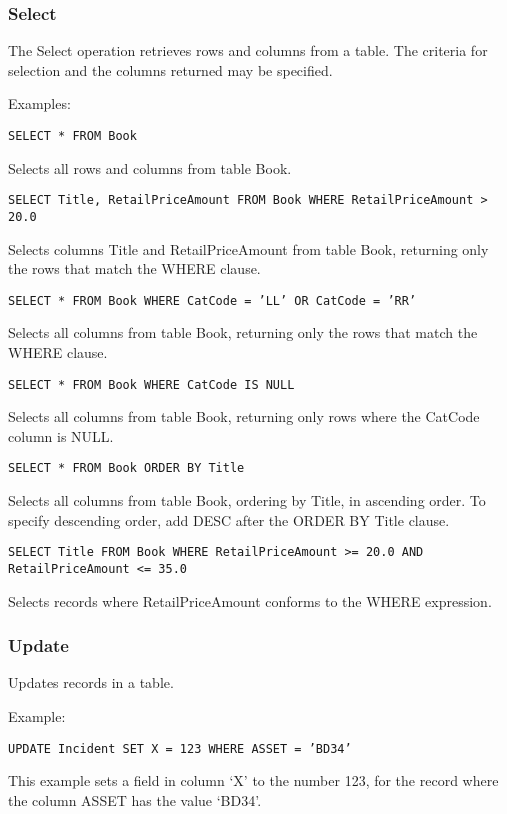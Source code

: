 \subsubsection{Select}\label{odbcselectexample}

The Select operation retrieves rows and columns from a table. The criteria
for selection and the columns returned may be specified.

Examples:

{\tt SELECT * FROM Book}

Selects all rows and columns from table Book.

{\tt SELECT Title, RetailPriceAmount FROM Book WHERE RetailPriceAmount > 20.0}

Selects columns Title and RetailPriceAmount from table Book, returning only
the rows that match the WHERE clause.

{\tt SELECT * FROM Book WHERE CatCode = 'LL' OR CatCode = 'RR'}

Selects all columns from table Book, returning only
the rows that match the WHERE clause.

{\tt SELECT * FROM Book WHERE CatCode IS NULL}

Selects all columns from table Book, returning only rows where the CatCode column
is NULL.

{\tt SELECT * FROM Book ORDER BY Title}

Selects all columns from table Book, ordering by Title, in ascending order. To specify
descending order, add DESC after the ORDER BY Title clause.

{\tt SELECT Title FROM Book WHERE RetailPriceAmount >= 20.0 AND RetailPriceAmount <= 35.0}

Selects records where RetailPriceAmount conforms to the WHERE expression.

\subsubsection{Update}\label{odbcupdateexample}

Updates records in a table.

Example:

{\tt UPDATE Incident SET X = 123 WHERE ASSET = 'BD34'}

This example sets a field in column `X' to the number 123, for the record
where the column ASSET has the value `BD34'.

